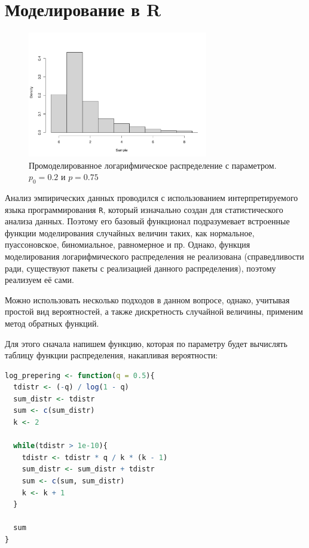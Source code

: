 \documentclass[12pt, specialist, subf, substylefile = spbu_report.rtx]{disser}
\begin{document}
	\section{Моделирование в R}
	
	\begin{figure}[ht]
		\centering
		\includegraphics[width = 0.7\textwidth]{logdistr}
		\caption{Промоделированное логарифмическое распределение с параметром. $ p _0 = 0.2 $ и $ p = 0.75 $}
		\label{img:logdist}
	\end{figure}
	
	Анализ эмпирических данных проводился с использованием интерпретируемого языка программирования \verb|R|, который изначально создан для статистического анализа данных. Поэтому его базовый функционал подразумевает встроенные функции моделирования случайных величин таких, как нормальное, пуассоновское, биномиальное, равномерное и пр. Однако, функция моделирования логарифмического распределения не реализована (справедливости ради, существуют пакеты с реализацией данного распределения), поэтому реализуем её сами.
	
	Можно использовать несколько подходов в данном вопросе, однако, учитывая простой вид вероятностей, а также дискретность случайной величины, применим метод обратных функций.
	
	Для этого сначала напишем функцию, которая по параметру будет вычислять таблицу функции распределения, накапливая вероятности:  
	
	\begin{lstlisting}[language=R]
log_prepering <- function(q = 0.5){
  tdistr <- (-q) / log(1 - q)
  sum_distr <- tdistr
  sum <- c(sum_distr)
  k <- 2
	
  while(tdistr > 1e-10){
    tdistr <- tdistr * q / k * (k - 1)
    sum_distr <- sum_distr + tdistr
    sum <- c(sum, sum_distr)
    k <- k + 1
  }
	
  sum
}
	\end{lstlisting}
	
\end{document}

